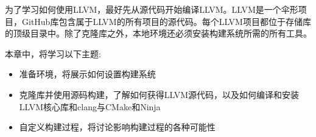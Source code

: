 为了学习如何使用LLVM，最好先从源代码开始编译LLVM。LLVM是一个伞形项目，GitHub库包含属于LLVM的所有项目的源代码。每个LLVM项目都位于存储库的顶级目录中。除了克隆库之外，本地环境还必须安装构建系统所需的所有工具。

本章中，将学习以下主题:

\begin{itemize}
\item
准备环境，将展示如何设置构建系统

\item
克隆库并使用源码构建，了解如何获得LLVM源代码，以及如何编译和安装LLVM核心库和clang与CMake和Ninja

\item
自定义构建过程，将讨论影响构建过程的各种可能性
\end{itemize}








